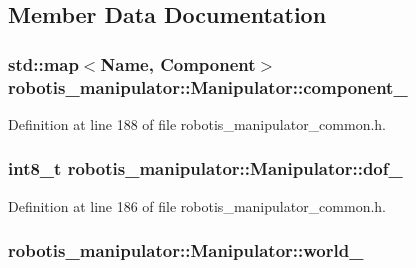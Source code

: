 \subsection{Member Data Documentation}
\subsubsection[{\texorpdfstring{component\+\_\+}{component_}}]{\setlength{\rightskip}{0pt plus 5cm}std\+::map$<${\bf Name}, {\bf Component}$>$ robotis\+\_\+manipulator\+::\+Manipulator\+::component\+\_\+\hspace{0.3cm}{\ttfamily [private]}}\hypertarget{classrobotis__manipulator_1_1_manipulator_a20b388b821f161972c2cf737fe1c26db}{}\label{classrobotis__manipulator_1_1_manipulator_a20b388b821f161972c2cf737fe1c26db}


Definition at line 188 of file robotis\+\_\+manipulator\+\_\+common.\+h.

\subsubsection[{\texorpdfstring{dof\+\_\+}{dof_}}]{\setlength{\rightskip}{0pt plus 5cm}int8\+\_\+t robotis\+\_\+manipulator\+::\+Manipulator\+::dof\+\_\+\hspace{0.3cm}{\ttfamily [private]}}\hypertarget{classrobotis__manipulator_1_1_manipulator_a39092ac588acd5e8713b55e18b85aebb}{}\label{classrobotis__manipulator_1_1_manipulator_a39092ac588acd5e8713b55e18b85aebb}


Definition at line 186 of file robotis\+\_\+manipulator\+\_\+common.\+h.

\subsubsection[{\texorpdfstring{world\+\_\+}{world_}}]{ robotis\+\_\+manipulator\+::\+Manipulator\+::world\+\_\+\hspace{0.3cm}{\ttfamily [private]}}\hypertarget{classrobotis__manipulator_1_1_manipulator_a2da05841bad220ca4072a11649777bb6}{}\label{classrobotis__manipulator_1_1_manipulator_a2da05841bad220ca4072a11649777bb6}


